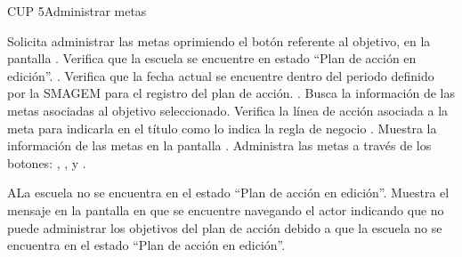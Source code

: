 \begin{UseCase}{CUP 5}{Administrar metas}



	
\end{UseCase}
 \begin{UCtrayectoria}
    \UCpaso[\UCactor] Solicita administrar las metas oprimiendo el botón \botAdm referente al objetivo, en la pantalla . %
	\UCpaso[\UCsist] Verifica que la escuela se encuentre en  estado ``Plan de acción en edición''. .
    \UCpaso[\UCsist] Verifica que la fecha actual se encuentre dentro del periodo definido por la SMAGEM para el registro del plan de acción. .    
    \UCpaso[\UCsist] Busca la información de las metas asociadas al objetivo seleccionado. 
    \UCpaso[\UCsist] Verifica la línea de acción asociada a la meta para indicarla en el título como lo indica la regla de negocio .
    \UCpaso[\UCsist] Muestra la información de las metas en la pantalla . 
    \UCpaso[\UCactor] Administra las metas a través de los botones: , \botAdm, \botEdit y \botKo. \label{cup5:Mostrar}
 \end{UCtrayectoria}
 \begin{UCtrayectoriaA}{A}{La escuela no se encuentra en el estado ``Plan de acción en edición''.}
    \UCpaso[\UCsist] Muestra el mensaje  en la pantalla en que se encuentre navegando el actor indicando que no puede administrar los objetivos del plan de acción debido a que la escuela no se encuentra en el estado ``Plan de acción en edición''. 
 \end{UCtrayectoriaA}
 
